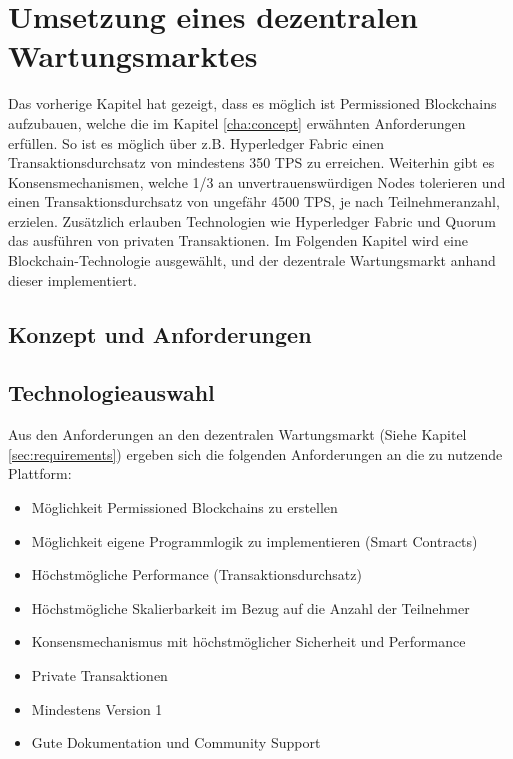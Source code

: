 \chapter{Umsetzung eines dezentralen Wartungsmarktes}
\label{cha:wartungsmarkt-impl}

Das vorherige Kapitel hat gezeigt, dass es möglich ist Permissioned Blockchains aufzubauen, welche die im Kapitel \ref{cha:concept} erwähnten Anforderungen erfüllen. So ist es möglich über z.B. Hyperledger Fabric einen Transaktionsdurchsatz von mindestens 350 TPS zu erreichen. Weiterhin gibt es Konsensmechanismen, welche 1/3 an unvertrauenswürdigen Nodes tolerieren und einen Transaktionsdurchsatz von ungefähr 4500 TPS, je nach Teilnehmeranzahl, erzielen. Zusätzlich erlauben Technologien wie Hyperledger Fabric und Quorum das ausführen von privaten Transaktionen. Im Folgenden Kapitel wird eine Blockchain-Technologie ausgewählt, und der dezentrale Wartungsmarkt anhand dieser implementiert.  

\section{Konzept und Anforderungen}


\section{Technologieauswahl}
Aus den Anforderungen an den dezentralen Wartungsmarkt (Siehe Kapitel \ref{sec:requirements}) ergeben sich die folgenden Anforderungen an die zu nutzende Plattform: 

\begin{itemize}
    \item Möglichkeit Permissioned Blockchains zu erstellen
    \item Möglichkeit eigene Programmlogik zu implementieren (Smart Contracts)
    \item Höchstmögliche Performance (Transaktionsdurchsatz)
    \item Höchstmögliche Skalierbarkeit im Bezug auf die Anzahl der Teilnehmer
    \item Konsensmechanismus mit höchstmöglicher Sicherheit und Performance
    \item Private Transaktionen   
    \item Mindestens Version 1
    \item Gute Dokumentation und Community Support
\end{itemize}

